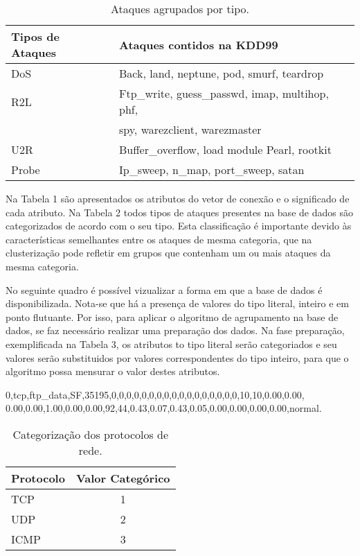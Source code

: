 \begin{table}[h]
\centering
\caption{Ataques agrupados por tipo.}
\vspace{0.5cm}
\begin{tabular}{|l|l|}
\hline
\textbf{Tipos de Ataques} & \textbf{Ataques contidos na KDD99}\\
\hline
DoS &	Back, land, neptune, pod, smurf, teardrop \\
\hline
R2L &	Ftp\_write, guess\_passwd, imap, multihop, phf,\\ & spy, warezclient, warezmaster \\
\hline
U2R &	Buffer\_overflow, load module Pearl, rootkit\\
\hline
Probe &	Ip\_sweep, n\_map, port\_sweep, satan\\
\hline
\end{tabular}
\end{table}

\indent Na Tabela 1 são apresentados os atributos do vetor de conexão e o significado de cada atributo. Na Tabela 2 todos tipos de ataques presentes na base de dados são categorizados de acordo com o seu tipo. Esta classificação é importante devido às características semelhantes entre os ataques de mesma categoria, que na clusterização pode refletir em grupos que contenham um ou mais ataques da mesma categoria.

\indent No seguinte quadro é possível vizualizar a forma em que a base de dados é disponibilizada. Nota-se que há a presença de valores do tipo literal, inteiro e em ponto flutuante. Por isso, para aplicar o algoritmo de agrupamento na base de dados, se faz necessário realizar uma preparação dos dados. Na fase preparação, exemplificada na Tabela 3, os atributos to tipo literal serão categoriados e seu valores serão substituidos por valores correspondentes do tipo inteiro, para que o algoritmo possa mensurar o valor destes atributos.
\vspace{0.5cm}
\begin{mdframed}[userdefinedwidth=1.0\textwidth,align=left,frametitle={Vetor de conexão original KDD99}]
0,tcp,ftp\_data,SF,35195,0,0,0,0,0,0,0,0,0,0,0,0,0,0,0,0,0,10,10,0.00,0.00,\\
0.00,0.00,1.00,0.00,0.00,92,44,0.43,0.07,0.43,0.05,0.00,0.00,0.00,0.00,normal.
\end{mdframed}

\begin{table}[h]
\centering
\caption{Categorização dos protocolos de rede.}
\vspace{0.5cm}
\begin{tabular}{|l|c|}
\hline
\textbf{Protocolo} & \textbf{Valor Categórico}\\
\hline
TCP & 1\\
\hline
UDP & 2\\
\hline
ICMP & 3\\
\hline
\end{tabular}
\end{table}

